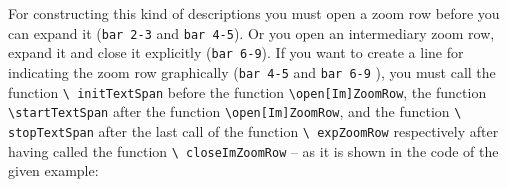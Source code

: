 \documentclass[
  DIV=calc,
  BCOR=5mm,
  12pt,
  headings=small,
  oneside,
  abstract=true,
  toc=bib,
  xcolor=dvipsnames,
  openany,
  english]{scrartcl}
\begin{document}
\begin{center}
\end{center}

For constructing this kind of descriptions you must open a zoom row before you
can expand it (\texttt{bar 2-3} and \texttt{bar 4-5}). Or you open an
intermediary zoom row, expand it and close it explicitly (\texttt{bar 6-9}). If
you want to create a line for indicating the zoom row graphically (\texttt{bar
4-5} and \texttt{bar 6-9} ), you must call the function \texttt{\textbackslash
initTextSpan} before the function \texttt{\textbackslash open[Im]ZoomRow}, the
function \texttt{\textbackslash startTextSpan} after the function
\texttt{\textbackslash open[Im]ZoomRow}, and the function \texttt{\textbackslash
stopTextSpan} after the last call of the function \texttt{\textbackslash
expZoomRow} respectively after having called the function \texttt{\textbackslash
closeImZoomRow} -- as it is shown in the code of the given example:
\end{document}
